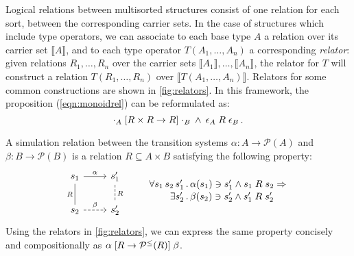 \documentclass[sigplan,screen]{acmart}
\begin{document}
Logical relations between multisorted structures
consist of one relation for each sort,
between the corresponding carrier sets.
In the case of structures which include type operators,
we can associate to each base type $A$
a relation over its carrier set $\llbracket A \rrbracket$,
and to each type operator $T(A_1, \ldots, A_n)$
a corresponding \emph{relator}:
given relations $R_1, \ldots, R_n$ over
the carrier sets $\llbracket A_1 \rrbracket, \ldots, \llbracket A_n \rrbracket$,
the relator for $T$
will construct a relation $T(R_1, \ldots, R_n)$
over $\llbracket T(A_1, \ldots, A_n) \rrbracket$.
Relators for some common constructions are shown in \autoref{fig:relators}.
In this framework, the proposition (\ref{eqn:monoidrel}) can be reformulated as:
\[
  \cdot_A \mathrel{[{R \times R \rightarrow R}]} \cdot_B
  \: \wedge \:
  \epsilon_A \mathrel{R} \epsilon_B \,.
\]

\begin{example} \label{ex:simrel} %
A simulation relation
between the transition systems
$\alpha : A \rightarrow \mathcal{P}(A)$ and
$\beta : B \rightarrow \mathcal{P}(B)$
is a relation $R \subseteq A \times B$
satisfying the following property:
\[
  \begin{tikzcd}[scale=0.8]
    s_1 \arrow[r, "\alpha"]
        \arrow[d, dash, "R"'] &
    s_1' \arrow[d, dashed, dash, "R"] \\
    s_2 \arrow[r, dashed, "\beta"] &
    s_2'
  \end{tikzcd}
  \qquad
  \label{eqn:simrel}
  \begin{array}{r@{\,.\,}l}
    \forall s_1 \, s_2 \, s_1' &
      \alpha(s_1) \ni s_1' \wedge s_1 \mathrel{R} s_2 \Rightarrow
    \\[0.25ex]
    \exists s_2' &
      \beta(s_2) \ni s_2' \wedge s_1' \mathrel{R} s_2'
  \end{array}
\]
Using the relators in \autoref{fig:relators},
we can express the same property
concisely and compositionally as
$
  \alpha \mathrel{[{R \rightarrow \mathcal{P}^\le(R)}]} \beta
$.
\end{example}
\end{document}

